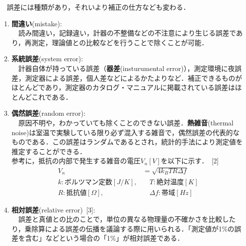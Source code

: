 \documentclass[fleqn,dvipdfmx]{jarticle}
\begin{document}
　誤差には種類があり，それいより補正の仕方なども変わる．
\begin{enumerate}
	\item \textbf{間違い}(mistake):\\
		　読み間違い，記録違い，計器の不整備などの不注意により生じる誤差であり，再測定，理論値との比較などを行うことで除くことが可能．
	\item \textbf{系統誤差}(system error):\\
		　計器自体が持っている誤差（\textbf{器差}(insturumental error)），測定環境に夜誤差，測定器による誤差，個人差などによるかたよりなど．補正できるものがほとんどであり，測定器のカタログ・マニュアルに掲載されている誤差はほとんどこれである．
	\item \textbf{偶然誤差}(random error):\\
		　原因不明や，わかっていても除くことのできない誤差．\textbf{熱雑音}(thermal noise)は室温で実験している限り必ず混入する雑音で，偶然誤差の代表的なものである．この誤差はランダムであるとされ，統計的手法により測定値を推定することができる．\\
		参考に，抵抗の内部で発生する雑音の電圧$V_n[V]$を以下に示す．~[2]
		\begin{align*}
			V_n&=\sqrt{4k_BTR\Delta f}\\
			k:ボルツマン定数[J/K],&\quad T:絶対温度[K]\\
			R:抵抗値[\Omega],&\quad\Delta f:帯域[Hz]
		\end{align*}
	\item \textbf{相対誤差}(relative error)~[3]:\\
		　誤差と真値との比のことで，単位の異なる物理量の不確かさを比較したり，乗除算による誤差の伝播を議論する際に用いられる．「測定値が1\%の誤差を含む」などという場合の「1\%」が相対誤差である．
\end{enumerate}
\end{document}
